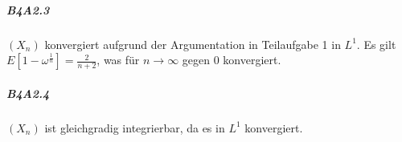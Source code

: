 \documentclass{article}
\begin{document}
\subparagraph{B4A2.3} $(X_n)$ konvergiert aufgrund der Argumentation in Teilaufgabe 1 in $L^1$.
Es gilt $E[1-\omega^{\frac{1}{n}}]=\frac{2}{n+2}$, was für $n\to\infty$ gegen 0 konvergiert.

\subparagraph{B4A2.4} $(X_n)$ ist gleichgradig integrierbar, da es in $L^1$ konvergiert.
\newpage


\end{document}
